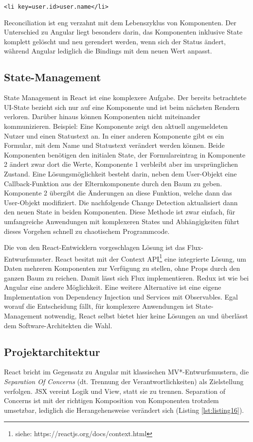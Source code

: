 \texttt{<li key={user.id}>{user.name}</li>}

Reconciliation ist eng verzahnt mit dem Lebenszyklus von Komponenten. Der Unterschied zu Angular liegt besonders darin, das Komponenten inklusive State komplett gelöscht und neu gerendert werden, wenn sich der Status ändert, während Angular lediglich die Bindings mit dem neuen Wert anpasst.\cite{Reconciliation}

\subsection{State-Management}
State Management in React ist eine komplexere Aufgabe. Der bereits betrachtete UI-State bezieht sich nur auf eine Komponente und ist beim nächsten Rendern verloren. Darüber hinaus können Komponenten nicht miteinander kommunizieren. Beispiel: Eine Komponente zeigt den aktuell angemeldeten Nutzer und einen Statustext an. In einer anderen Komponente gibt es ein Formular, mit dem Name und Statustext verändert werden können. Beide Komponenten benötigen den initialen State, der Formulareintrag in Komponente 2 ändert zwar dort die Werte, Komponente 1 verbleibt aber im ursprünglichen Zustand. Eine Lösungsmöglichkeit besteht darin, neben dem User-Objekt eine Callback-Funktion aus der Elternkomponente durch den Baum zu geben. Komponente 2 übergibt die Änderungen an diese Funktion, welche dann das User-Objekt modifiziert. Die nachfolgende Change Detection aktualisiert dann den neuen State in beiden Komponenten. Diese Methode ist zwar einfach, für umfangreiche Anwendungen mit komplexeren States und Abhängigkeiten führt dieses Vorgehen schnell zu chaotischem Programmcode. 

Die von den React-Entwicklern vorgeschlagen Lösung ist das Flux-Entwurfsmuster. React besitzt mit der Context API\footnote{siehe: https://reactjs.org/docs/context.html} eine integrierte Lösung, um Daten mehreren Komponenten zur Verfügung zu stellen, ohne Props durch den ganzen Baum zu reichen. Damit lässt sich Flux implementieren. Redux ist wie bei Angular eine andere Möglichkeit. Eine weitere Alternative ist eine eigene Implementation von Dependency Injection und Services mit Observables. Egal worauf die Entscheidung fällt, für komplexere Anwendungen ist State-Management notwendig, React selbst bietet hier keine Lösungen an und überlässt dem Software-Architekten die Wahl. 

\subsection{Projektarchitektur}
React bricht im Gegensatz zu Angular mit klassischen MV*-Entwurfsmustern, die \textit{Separation Of Concerns} (dt. Trennung der Verantwortlichkeiten) als Zielstellung verfolgen. JSX vereint Logik und View, statt sie zu trennen. Separation of Concerns ist mit der richtigen Komposition von Komponenten trotzdem umsetzbar, lediglich die Herangehensweise verändert sich (Listing \ref{lst:listing16}).

